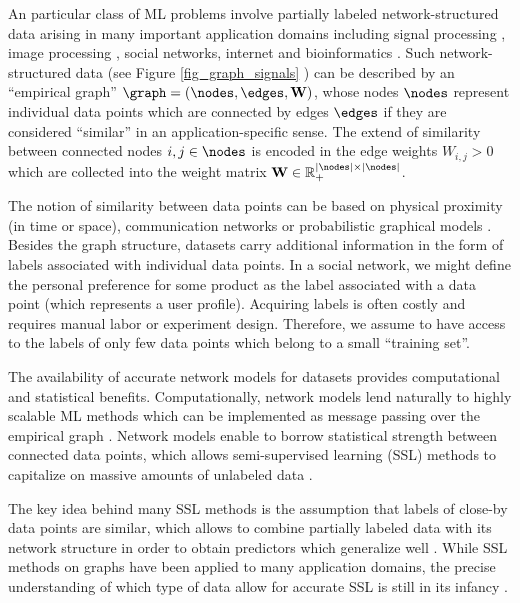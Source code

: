 \documentclass[12pt]{report}
\begin{document}
An particular class of ML problems involve partially labeled network-structured data arising in many 
important application domains including signal processing \cite{ChenVarma,Chen2015}, image 
processing \cite{LempKohli2009,ShiMalik2000}, social networks, internet and bioinformatics 
\cite{NewmannBook,SemiSupervisedBook,Fergus2009}. Such network-structured data 
(see Figure \ref{fig_graph_signals} ) can be described by an ``empirical graph'' $\graph=(\nodes,\edges,\mathbf{W})$,  
whose nodes $\nodes$ represent individual data points which are connected by edges $\edges$ 
if they are considered ``similar'' in an application-specific sense. The extend of similarity between 
connected nodes $i,j \in \nodes$ is encoded in the edge weights $W_{i,j} > 0$ which are collected 
into the weight matrix $\mathbf{W} \in \mathbb{R}_{+}^{|\nodes| \times |\nodes|}$.  

The notion of similarity between data points can be based on physical proximity (in time or space), 
communication networks or probabilistic graphical models \cite{LauritzenGM,BishopBook,koller2009probabilistic}. 
Besides the graph structure, datasets carry additional information in the form of labels associated 
with individual data points. In a social network, we might define the personal preference for some 
product as the label associated with a data point (which represents a user profile). Acquiring labels 
is often costly and requires manual labor or experiment design. Therefore, we assume to have 
access to the labels of only few data points which belong to a small ``training set''. 

The availability of accurate network models for datasets provides computational and statistical benefits. 
Computationally, network models lend naturally to highly scalable ML methods which 
can be implemented as message passing over the empirical graph \cite{DistrOptStatistLearningADMM}. 
Network models enable to borrow statistical strength between connected data points, which allows 
semi-supervised learning (SSL) methods to capitalize on massive amounts of unlabeled data \cite{SemiSupervisedBook}. 

The key idea behind many SSL methods is the assumption that labels of close-by data points are similar, 
which allows to combine partially labeled data with its network structure in order to obtain predictors which generalize 
well \cite{SemiSupervisedBook,belkin2004regularization}. While SSL methods on graphs have been 
applied to many application domains, the precise understanding of which type of data allow for 
accurate SSL is still in its infancy \cite{ijcai2017-450,NSZ09,elalaoui16}. 
\end{document}
